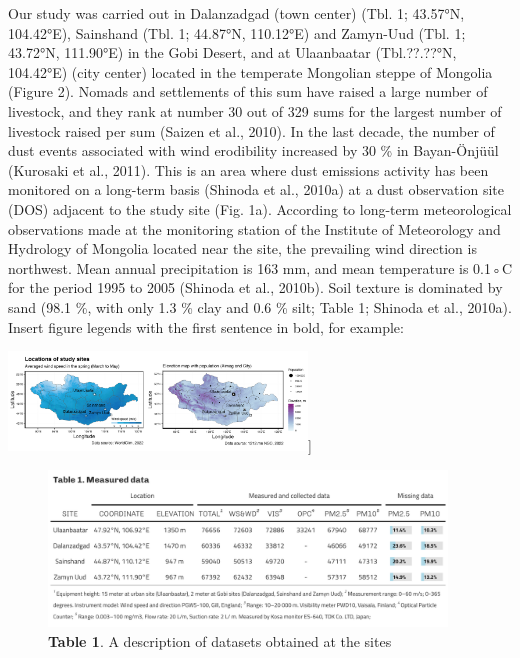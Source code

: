 \documentclass[
  11pt,
]{article}
\begin{document}
Our study was carried out in Dalanzadgad (town center) (Tbl. 1; 43.57°N,
104.42°E), Sainshand (Tbl. 1; 44.87°N, 110.12°E) and Zamyn-Uud (Tbl. 1;
43.72°N, 111.90°E) in the Gobi Desert, and at Ulaanbaatar (Tbl.??.??°N,
104.42°E) (city center) located in the temperate Mongolian steppe of
Mongolia (Figure 2). Nomads and settlements of this sum have raised a
large number of livestock, and they rank at number 30 out of 329 sums
for the largest number of livestock raised per sum (Saizen et al.,
2010). In the last decade, the number of dust events associated with
wind erodibility increased by 30 \% in Bayan-Önjüül (Kurosaki et al.,
2011). This is an area where dust emissions activity has been monitored
on a long-term basis (Shinoda et al., 2010a) at a dust observation site
(DOS) adjacent to the study site (Fig. 1a). According to long-term
meteorological observations made at the monitoring station of the
Institute of Meteorology and Hydrology of Mongolia located near the
site, the prevailing wind direction is northwest. Mean annual
precipitation is 163 mm, and mean temperature is 0.1◦C for the period
1995 to 2005 (Shinoda et al., 2010b). Soil texture is dominated by sand
(98.1 \%, with only 1.3 \% clay and 0.6 \% silt; Table 1; Shinoda et
al., 2010a). Insert figure legends with the first sentence in bold, for
example:

\newpage

\includegraphics[width=3.125in,height=\textheight,keepaspectratio]{images/figure_1.png}{]}

\begin{figure}
\centering
\includegraphics[width=4.16667in,height=\textheight,keepaspectratio]{images/table_1.png}
\caption{\textbf{Table 1}. A description of datasets obtained at the
sites}
\end{figure}
\end{document}
